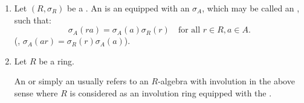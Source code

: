 \begin{definition} \label{definition:algebra_with_involution_over_a_ring_with_involution}
    \begin{enumerate}
        \item 

        Let $(R, \sigma_R)$ be a . 
        An  is an  
        equipped with an  $\sigma_A$, which may be called an , such that:
        \begin{equation*}
            \sigma_A(ra) = \sigma_A(a)\sigma_R(r) \quad \text{for all } r \in R, a \in A.
        \end{equation*}
        (, $\sigma_A(ar) = \sigma_R(r)\sigma_A(a)$).

        \item Let $R$ be a ring.

        An  or simply an  usually refers to an $R$-algebra with involution in the above sense where $R$ is considered as an involution ring equipped with the .
    \end{enumerate}


\end{definition}